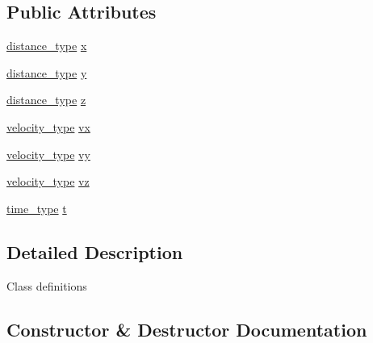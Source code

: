 \subsection*{Public Attributes}
\begin{DoxyCompactItemize}
\item 
\hyperlink{namespaceIceBRG_a45499647eb87e24c10ab32c628711cec}{distance\+\_\+type} \hyperlink{structIceBRG_1_1phase_ab8b6fb1682a92ccde92c2862e01fe5d2}{x}
\item 
\hyperlink{namespaceIceBRG_a45499647eb87e24c10ab32c628711cec}{distance\+\_\+type} \hyperlink{structIceBRG_1_1phase_a6c2907eb5f6a5d96368d3901a4e527b0}{y}
\item 
\hyperlink{namespaceIceBRG_a45499647eb87e24c10ab32c628711cec}{distance\+\_\+type} \hyperlink{structIceBRG_1_1phase_aab11405e00390231409ad36f24c18480}{z}
\item 
\hyperlink{namespaceIceBRG_a34f8ef3b46f3408301e3c28197095eff}{velocity\+\_\+type} \hyperlink{structIceBRG_1_1phase_a64ee85241a9ac0457b8f167d8fd3a435}{vx}
\item 
\hyperlink{namespaceIceBRG_a34f8ef3b46f3408301e3c28197095eff}{velocity\+\_\+type} \hyperlink{structIceBRG_1_1phase_a399932e300cb0d13e15ffac5f71c734d}{vy}
\item 
\hyperlink{namespaceIceBRG_a34f8ef3b46f3408301e3c28197095eff}{velocity\+\_\+type} \hyperlink{structIceBRG_1_1phase_acacd478d07601c3d8c7edb7d7f1ba6de}{vz}
\item 
\hyperlink{namespaceIceBRG_abf6c442a2e180ef52c5cefe18e47c327}{time\+\_\+type} \hyperlink{structIceBRG_1_1phase_aeade05ce501fcc4b3232f6ccf8459757}{t}
\end{DoxyCompactItemize}


\subsection{Detailed Description}
Class definitions 

\subsection{Constructor \& Destructor Documentation}
\hypertarget{structIceBRG_1_1phase_a8fae2a7a33d826010fe86e5d21f368bf}{}
